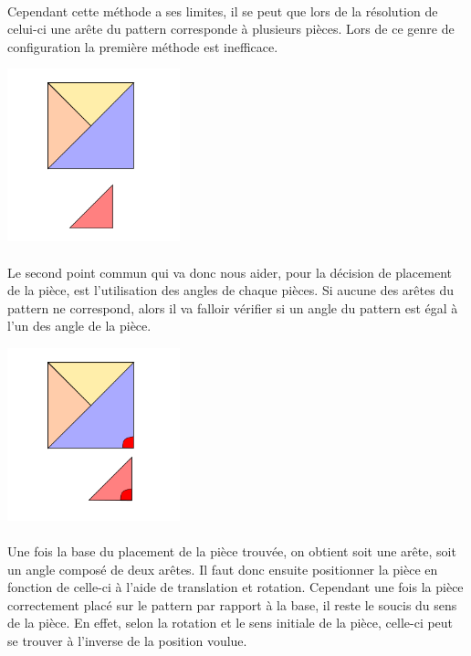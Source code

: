 \documentclass{report}
\begin{document}
    \paragraph{}Cependant cette méthode a ses limites, il se peut que lors de la résolution de
    celui-ci une arête du pattern corresponde à plusieurs pièces. Lors de ce genre de configuration
    la première méthode est inefficace. 

    \begin{center}
    \includegraphics[width=5cm]{place_figure_probleme_exacte_match}
    \end{center}

    \paragraph{}Le second point commun qui va donc nous aider, pour la décision de placement de la
    pièce, est l'utilisation des angles de chaque pièces. Si aucune des arêtes du pattern ne
    correspond, alors il va falloir vérifier si un angle du pattern est égal à l'un des angle de la
    pièce. 

    \begin{center}
    \includegraphics[width=5cm]{place_figure_probleme_angle_match}
    \end{center}

    \paragraph{}Une fois la base du placement de la pièce trouvée, on obtient soit une arête, soit
    un angle composé de deux arêtes. Il faut donc ensuite positionner la pièce en fonction de
    celle-ci à l'aide de translation et rotation. Cependant une fois la pièce correctement placé
    sur le pattern par rapport à la base, il reste le soucis du sens de la pièce. En effet, selon la
    rotation et le sens initiale de la pièce, celle-ci peut se trouver à l'inverse de la position
    voulue. 
\end{document}
